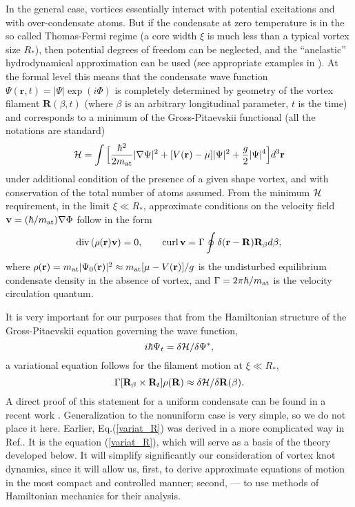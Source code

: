 \documentclass[pra,twocolumn,showpacs]{revtex4}
\begin{document}
In the general case, vortices essentially interact with potential excitations and with over-condensate
atoms. But if the condensate at zero temperature is in the so called Thomas-Fermi regime (a core width 
$\xi$ is much less than a typical vortex size $R_*$), then potential degrees of freedom can be neglected,
and the ``anelastic'' hydrodynamical approximation can be used (see appropriate examples in 
\cite{SF2000,FS2001,R2001,A2002,SR2004,BN2015,R2017-1,R2017-2}). At the formal level this means that
the condensate wave function $\Psi({\mathbf r},t)=|\Psi|\exp(i\Phi)$ is completely determined by
geometry of the vortex filament ${\mathbf R}(\beta,t)$ (where $\beta$ is an arbitrary longitudinal
parameter, $t$ is the time) and corresponds to a minimum of the Gross-Pitaevskii functional
(all the notations are standard)
\begin{equation}
{\cal H}=\int \Big[\frac{\hbar^2}{2m_{\rm at}}|\nabla\Psi|^2
+[V({\bf r})-\mu]|\Psi|^2+\frac{g}{2}|\Psi|^4\Big]d^3{\bf r}
\end{equation}
under additional condition of the presence of a given shape vortex, and with conservation of 
the total number of atoms assumed. From the minimum ${\cal H}$ requirement, in the limit $\xi\ll R_*$,
approximate conditions on the velocity field ${\bf v}=(\hbar/m_{\rm at})\nabla\Phi$ follow in the form
\begin{equation}
\mbox{div\,}(\rho({\bf r}){\bf v})=0, \qquad \mbox{curl\,}
{\bf v}=\Gamma\oint\delta({\bf r}-{\bf R}){\bf R}_\beta d\beta,
\label{velocity}
\end{equation}
where $\rho({\bf r})=m_{\rm at}|\Psi_0({\bf r})|^2\approx m_{\rm at}[\mu-V({\bf r})]/g$ is the 
undisturbed equilibrium condensate density in the absence of vortex, and
$\Gamma=2\pi\hbar/m_{\rm at}$ is the velocity circulation quantum.

It is very important for our purposes that from the Hamiltonian structure of the Gross-Pitaevskii 
equation governing the wave function,
\begin{equation}
i\hbar\Psi_t={\delta{\cal H}}/{\delta\Psi^*},
\label{Psi_variat}
\end{equation}
a variational equation follows for the filament motion at $\xi\ll R_*$,
\begin{equation}
\Gamma[{\bf R}_\beta\times{\bf R}_t]\rho({\bf R})\approx \delta{\cal H}/\delta{\bf R(\beta)}.
\label{variat_R}
\end{equation}
A direct proof of this statement for a uniform condensate can be found in a recent work \cite{BN2015}.
Generalization to the nonuniform case is very simple, so we do not place it here.
Earlier, Eq.(\ref{variat_R}) was derived in a more complicated way in Ref.\cite{R2001}.
It is the equation (\ref{variat_R}), which will serve as a basis of the theory developed below.
It will simplify significantly our consideration of vortex knot dynamics, since it will allow us, first,
to derive approximate equations of motion in the most compact and controlled manner; second, 
--- to use methods of Hamiltonian mechanics for their analysis.
\end{document}
